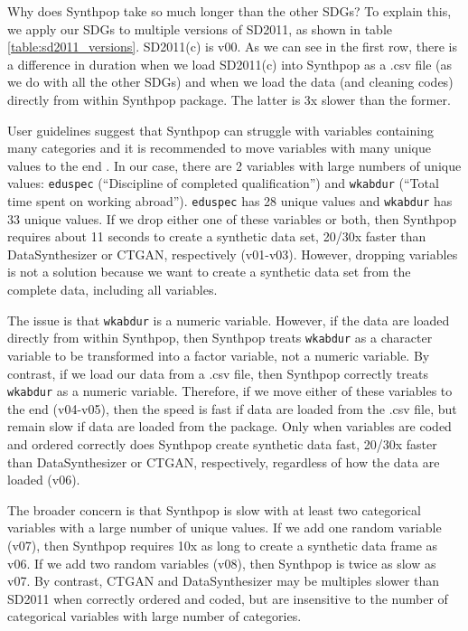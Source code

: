 \documentclass[runningheads]{llncs}
\begin{document}
Why does Synthpop take so much longer than the other SDGs?  To explain this, we apply our SDGs to multiple versions of SD2011, as shown in table \ref{table:sd2011_versions}.  SD2011(c) is v00.  As we can see in the first row, there is a difference in duration when we load SD2011(c) into Synthpop as a .csv file (as we do with all the other SDGs) and when we load the data (and cleaning codes) directly from within Synthpop package.  The latter is 3x slower than the former.   

User guidelines suggest that Synthpop can struggle with variables containing many categories and it is recommended to move variables with many unique values to the end \cite{raab2017guidelines}.  In our case, there are 2 variables with large numbers of unique values: \texttt{eduspec} (``Discipline of completed qualification'') and \texttt{wkabdur} (``Total time spent on working abroad'').  \texttt{eduspec} has 28 unique values and \texttt{wkabdur} has 33 unique values.  If we drop either one of these variables or both, then Synthpop requires about 11 seconds to create a synthetic data set, 20/30x faster than DataSynthesizer or CTGAN, respectively (v01-v03).  However, dropping variables is not a solution because we want to create a synthetic data set from the complete data, including all variables.   

The issue is that \texttt{wkabdur} is a numeric variable.  However, if the data are loaded directly from within Synthpop, then Synthpop treats \texttt{wkabdur} as a character variable to be transformed into a factor variable, not a numeric variable.  By contrast, if we load our data from a .csv file, then Synthpop correctly treats  \texttt{wkabdur} as a numeric variable.  Therefore, if we move either of these variables to the end (v04-v05), then the speed is fast if data are loaded from the .csv file, but remain slow if data are loaded from the package.  Only when variables are coded and ordered correctly does Synthpop create synthetic data fast, 20/30x faster than DataSynthesizer or CTGAN, respectively, regardless of how the data are loaded (v06).  

The broader concern is that Synthpop is slow with at least two categorical variables with a large number of unique values.  If we add one random variable (v07), then Synthpop requires 10x as long to create a synthetic data frame as v06.  If we add two random variables (v08), then Synthpop is twice as slow as v07.  By contrast, CTGAN and DataSynthesizer may be multiples slower than SD2011 when correctly ordered and coded, but are insensitive to the number of categorical variables with large number of categories.  
\end{document}
